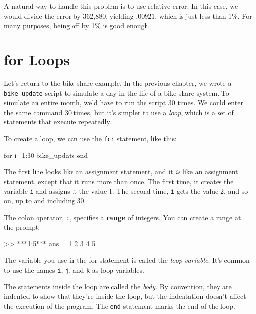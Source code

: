 A natural way to handle this problem is to use relative
error.
In this case, we would divide the error
by 362,880, yielding $.00921$, which is just less than 1\%.
For many purposes, being off by 1\% is good enough.


\section{for Loops}


Let's return to the bike share example. 
In the previous chapter, we wrote a \verb"bike_update" script to simulate a
day in the life of a bike share system. To simulate an entire
month, we'd have to run the script 30 times. We could enter the same command 30 times, but it's simpler to use a \emph{loop}, which is a set of statements that execute repeatedly.

To create a loop, we can use the {\tt for} statement, like this:

\begin{code}
for i=1:30
    bike_update
end
\end{code}

The first line looks like an assignment statement, and it {\em is}
like an assignment statement, except that it runs more than once.  The
first time, it creates the variable {\tt i} and assigns it the
value 1.  The second time, {\tt i} gets the value 2, and so on, up to
and including 30.


The colon operator, {\tt :}, specifies a {\bf range} of integers.
You can create a range at the prompt:

\begin{code}
>> ***1:5***
ans =  1     2     3     4     5
\end{code}

The variable you use in the for statement is called the \emph{loop
variable}.  It's common to use the names {\tt i},
{\tt j}, and {\tt k} as loop variables.


The statements inside the loop are called the \emph{body}.  By convention,
they are indented to show that they're inside the loop, but the
indentation doesn't affect the execution of the program.
The {\tt end} statement marks the end of the loop.

